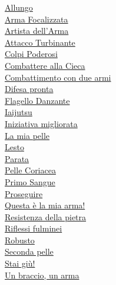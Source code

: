 \begin{multicols}{3}
{\begin{flushleft}
\hyperlink{Allungo}{Allungo}\\
\hyperlink{Arma Focalizzata}{Arma Focalizzata}\\
\hyperlink{Artista dell'Arma}{Artista dell'Arma}\\
\hyperlink{Attacco Turbinante}{Attacco Turbinante}\\
\hyperlink{Colpi Poderosi}{Colpi Poderosi}\\
\hyperlink{Combattere alla Cieca}{Combattere alla Cieca}\\
\hyperlink{Combattimento con due armi}{Combattimento con due armi}\\
\hyperlink{Difesa pronta}{Difesa pronta}\\
\hyperlink{Flagello Danzante}{Flagello Danzante}\\
\hyperlink{Iaijutsu}{Iaijutsu}\\
\hyperlink{Iniziativa migliorata}{Iniziativa migliorata}\\
\hyperlink{La mia pelle}{La mia pelle}\\
\hyperlink{Lesto}{Lesto}\\
\hyperlink{Parata}{Parata}\\
\hyperlink{Pelle Coriacea}{Pelle Coriacea}\\
\hyperlink{Primo Sangue}{Primo Sangue}\\
\hyperlink{Proseguire}{Proseguire}\\
\hyperlink{Questa è la mia arma!}{Questa è la mia arma!}\\
\hyperlink{Resistenza della pietra}{Resistenza della pietra}\\
\hyperlink{Riflessi fulminei}{Riflessi fulminei}\\
\hyperlink{Robusto}{Robusto}\\
\hyperlink{Seconda pelle}{Seconda pelle}\\
\hyperlink{Stai giù!}{Stai giù!}\\
\hyperlink{Un braccio, un arma}{Un braccio, un arma}


\end{flushleft}}
\end{multicols}
